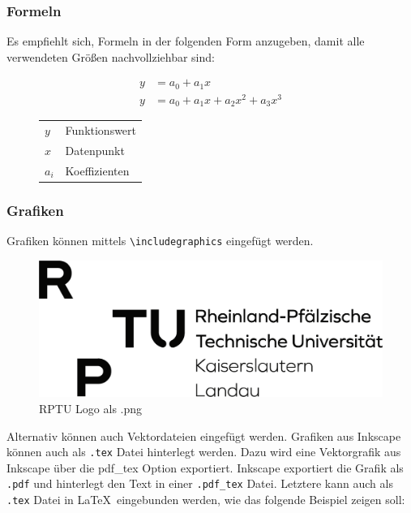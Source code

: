 \subsubsection{Formeln}\label{sec:2_1_1}
Es empfiehlt sich, Formeln in der folgenden Form anzugeben, damit alle verwendeten Größen nachvollziehbar sind:

\begin{figure}[ht]
    \begin{align}
        y & = a_0 + a_1x \label{eq:linear-Spline}\\
        y & = a_0 + a_1x + a_2x^2 + a_3x^3 \label{eq:cubic-Spline}
    \end{align}
    \footnotesize
    \begin{tabular}{ll}
    $y$   & Funktionswert \\
    $x$   & Datenpunkt \\
    $a_i$ & Koeffizienten
    \end{tabular}
    \normalsize
\end{figure}

\subsubsection{Grafiken}\label{sec:2_1_2}
Grafiken können mittels \verb|\includegraphics| eingefügt werden.
\begin{figure}[ht]
    \centering
    \includegraphics[scale=0.5]{Kap_2/Grafiken/RPTU_Logo_1c-1.png}
    \caption{RPTU Logo als .png}
    \label{fig:Kap_2_1_2_png}
\end{figure}

Alternativ können auch Vektordateien eingefügt werden.
Grafiken aus Inkscape können auch als \texttt{.tex} Datei hinterlegt werden.
Dazu wird eine Vektorgrafik aus Inkscape über die pdf\_tex Option exportiert.
Inkscape exportiert die Grafik als \texttt{.pdf} und hinterlegt den Text in einer \texttt{.pdf\_tex} Datei.
Letztere kann auch als \texttt{.tex} Datei in \LaTeX \ eingebunden werden, wie das folgende Beispiel zeigen soll:
\clearpage

